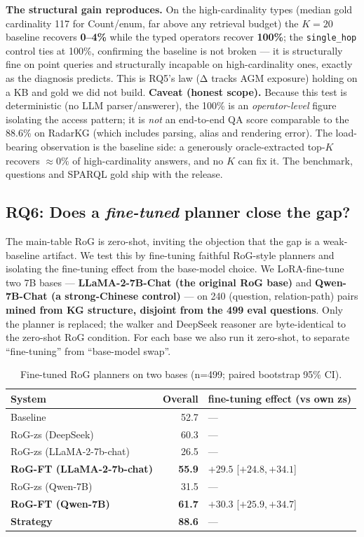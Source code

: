 \documentclass[11pt,a4paper]{article}
\newcommand{\qtype}[1]{\texttt{\small #1}}
\begin{document}
\textbf{The structural gain reproduces.} On the high-cardinality types (median gold cardinality 117 for Count/enum, far above any retrieval budget) the $K{=}20$ baseline recovers \textbf{0--4\%} while the typed operators recover \textbf{100\%}; the \qtype{single\_hop} control ties at 100\%, confirming the baseline is not broken --- it is structurally fine on point queries and structurally incapable on high-cardinality ones, exactly as the diagnosis predicts. This is RQ5's law (Δ tracks AGM exposure) holding on a KB and gold we did not build. \textbf{Caveat (honest scope).} Because this test is deterministic (no LLM parser/answerer), the 100\% is an \emph{operator-level} figure isolating the access pattern; it is \emph{not} an end-to-end QA score comparable to the 88.6\% on RadarKG (which includes parsing, alias and rendering error). The load-bearing observation is the baseline side: a generously oracle-extracted top-$K$ recovers ${\approx}0\%$ of high-cardinality answers, and no $K$ can fix it. The benchmark, questions and SPARQL gold ship with the release.

\subsection{RQ6: Does a \emph{fine-tuned} planner close the gap?}
\label{sec:rq6}

The main-table RoG is zero-shot, inviting the objection that the gap is a weak-baseline artifact. We test this by fine-tuning faithful RoG-style planners and isolating the fine-tuning effect from the base-model choice. We LoRA-fine-tune two 7B bases --- \textbf{LLaMA-2-7B-Chat (the original RoG base)} and \textbf{Qwen-7B-Chat (a strong-Chinese control)} --- on 240 (question, relation-path) pairs \textbf{mined from KG structure, disjoint from the 499 eval questions}. Only the planner is replaced; the walker and DeepSeek reasoner are byte-identical to the zero-shot RoG condition. For each base we also run it zero-shot, to separate ``fine-tuning'' from ``base-model swap''.

\begin{table}[h]
\centering
\small
\caption{Fine-tuned RoG planners on two bases (n=499; paired bootstrap 95\% CI).}
\label{tab:rogft}
\begin{tabular}{l r l}
\toprule
\textbf{System} & \textbf{Overall} & \textbf{fine-tuning effect (vs own zs)} \\
\midrule
Baseline                  & 52.7 & --- \\
RoG-zs (DeepSeek)         & 60.3 & --- \\
RoG-zs (LLaMA-2-7b-chat)  & 26.5 & --- \\
\textbf{RoG-FT (LLaMA-2-7b-chat)} & \textbf{55.9} & $\mathbf{+29.5}$ [$+24.8,+34.1$] \\
RoG-zs (Qwen-7B)          & 31.5 & --- \\
\textbf{RoG-FT (Qwen-7B)} & \textbf{61.7} & $\mathbf{+30.3}$ [$+25.9,+34.7$] \\
\textbf{Strategy}        & \textbf{88.6} & --- \\
\bottomrule
\end{tabular}
\end{table}
\end{document}
